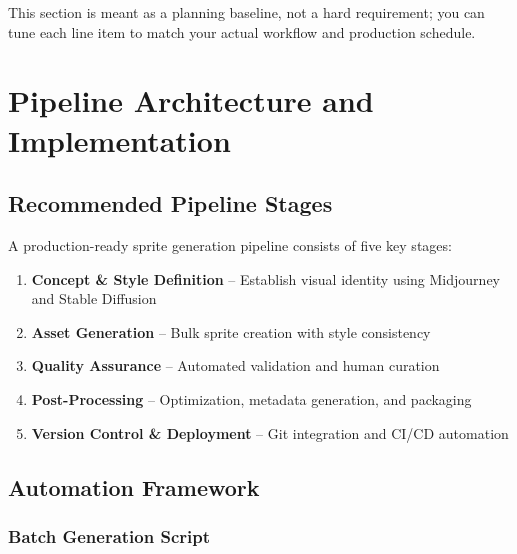\documentclass[11pt]{article}
\begin{document}
This section is meant as a planning baseline, not a hard requirement; you can tune each line item to match your actual workflow and production schedule.

\section{Pipeline Architecture and Implementation}

\subsection{Recommended Pipeline Stages}

A production-ready sprite generation pipeline consists of five key stages:

\begin{enumerate}
    \item \textbf{Concept \& Style Definition} -- Establish visual identity using Midjourney and Stable Diffusion
    \item \textbf{Asset Generation} -- Bulk sprite creation with style consistency
    \item \textbf{Quality Assurance} -- Automated validation and human curation
    \item \textbf{Post-Processing} -- Optimization, metadata generation, and packaging
    \item \textbf{Version Control \& Deployment} -- Git integration and CI/CD automation
\end{enumerate}

\subsection{Automation Framework}

\subsubsection{Batch Generation Script}
\end{document}
